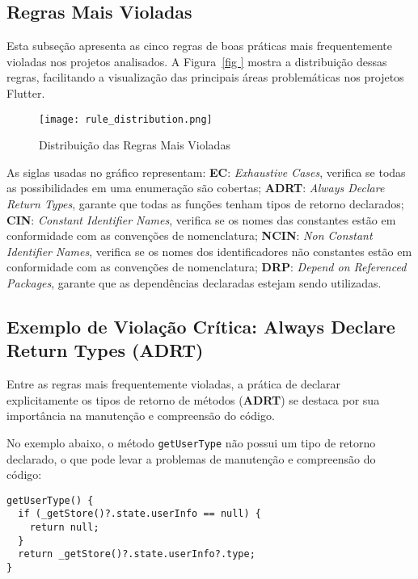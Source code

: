 \documentclass[12pt]{article}
\begin{document}
\subsection{Regras Mais Violadas}
Esta subseção apresenta as cinco regras de boas práticas mais frequentemente violadas nos projetos analisados. A Figura~\ref{fig
} mostra a distribuição dessas regras, facilitando a visualização das principais áreas problemáticas nos projetos Flutter.

\begin{figure}[H]
\centering
\texttt{[image: rule\_distribution.png]}
\caption{Distribuição das Regras Mais Violadas}
\label{fig:rule_distribution}
\end{figure}

As siglas usadas no gráfico representam: \textbf{EC}: \textit{Exhaustive Cases}, verifica se todas as possibilidades em uma enumeração são cobertas; \textbf{ADRT}: \textit{Always Declare Return Types}, garante que todas as funções tenham tipos de retorno declarados; \textbf{CIN}: \textit{Constant Identifier Names}, verifica se os nomes das constantes estão em conformidade com as convenções de nomenclatura; \textbf{NCIN}: \textit{Non Constant Identifier Names}, verifica se os nomes dos identificadores não constantes estão em conformidade com as convenções de nomenclatura; \textbf{DRP}: \textit{Depend on Referenced Packages}, garante que as dependências declaradas estejam sendo utilizadas.


\subsection{Exemplo de Violação Crítica: Always Declare Return Types (ADRT)}
Entre as regras mais frequentemente violadas, a prática de declarar explicitamente os tipos de retorno de métodos (\textbf{ADRT}) se destaca por sua importância na manutenção e compreensão do código.

No exemplo abaixo, o método \texttt{getUserType} não possui um tipo de retorno declarado, o que pode levar a problemas de manutenção e compreensão do código:

\begin{tcolorbox}[codeSnippetStyle={gsy\_github\_app\_flutter/lib/page/my\_page.dart}]
\begin{verbatim}
getUserType() {
  if (_getStore()?.state.userInfo == null) {
    return null;
  }
  return _getStore()?.state.userInfo?.type;
}
\end{verbatim}
\end{tcolorbox}
\end{document}
